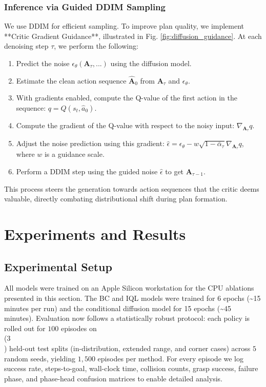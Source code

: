 \documentclass[conference]{IEEEtran}
\begin{document}
\subsubsection{Inference via Guided DDIM Sampling}
We use DDIM for efficient sampling. To improve plan quality, we implement **Critic Gradient Guidance**, illustrated in Fig. \ref{fig:diffusion_guidance}. At each denoising step $\tau$, we perform the following:
\begin{enumerate}
    \item Predict the noise $\epsilon_\theta(\mathbf{A}_\tau, ...)$ using the diffusion model.
    \item Estimate the clean action sequence $\hat{\mathbf{A}}_0$ from $\mathbf{A}_\tau$ and $\epsilon_\theta$.
    \item With gradients enabled, compute the Q-value of the first action in the sequence: $q = Q(s_t, \hat{a}_0)$.
    \item Compute the gradient of the Q-value with respect to the noisy input: $\nabla_{\mathbf{A}_\tau} q$.
    \item Adjust the noise prediction using this gradient: $\hat{\epsilon} = \epsilon_\theta - w \sqrt{1-\bar{\alpha}_\tau} \nabla_{\mathbf{A}_\tau} q$, where $w$ is a guidance scale.
    \item Perform a DDIM step using the guided noise $\hat{\epsilon}$ to get $\mathbf{A}_{\tau-1}$.
\end{enumerate}
This process steers the generation towards action sequences that the critic deems valuable, directly combating distributional shift during plan formation.


\section{Experiments and Results}

\subsection{Experimental Setup}
All models were trained on an Apple Silicon workstation for the CPU ablations presented in this section. The BC and IQL models were trained for 6 epochs (\textasciitilde15 minutes per run) and the conditional diffusion model for 15 epochs (\textasciitilde45 minutes). Evaluation now follows a statistically robust protocol: each policy is rolled out for $100$ episodes on \\(3\\) held-out test splits (in-distribution, extended range, and corner cases) across $5$ random seeds, yielding $1{,}500$ episodes per method. For every episode we log success rate, steps-to-goal, wall-clock time, collision counts, grasp success, failure phase, and phase-head confusion matrices to enable detailed analysis.
\end{document}
